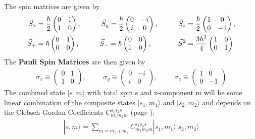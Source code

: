 The spin matrices are given by
\begin{align}
\vec{S}_x &= \frac{\hbar}{2}\begin{pmatrix}
0 & 1 \\ 1 & 0
\end{pmatrix}, \hspace{1cm}\vec{S}_y = \frac{\hbar}{2}\begin{pmatrix}
0 & -i \\ i & 0
\end{pmatrix}, \hspace{1cm}\vec{S}_z = \frac{\hbar}{2}\begin{pmatrix}
1 & 0 \\ 0 & -1
\end{pmatrix}, \\ \vec{S}_+ &= \hbar\begin{pmatrix}
0 & 1 \\ 0 & 0
\end{pmatrix}, \hspace{1cm}\vec{S}_- = \hbar\begin{pmatrix}
0 & 0 \\ 1 & 0
\end{pmatrix}, \hspace{1.3cm}\vec{S}^2 = \frac{3\hbar^2}{4}\begin{pmatrix}
1 & 0 \\ 0 & 1
\end{pmatrix}
\end{align}
The \textbf{Pauli Spin Matrices} are then given by
\begin{align}
\sigma_x \equiv \begin{pmatrix}
0 & 1 \\ 1 & 0
\end{pmatrix}, \hspace{1cm}\sigma_y \equiv \begin{pmatrix}
0 & -i \\ i & 0
\end{pmatrix}, \hspace{1cm}\sigma_z \equiv \begin{pmatrix}
1 & 0 \\ 0 & -1
\end{pmatrix}
\end{align}
The combined state $| s, m \rangle$  with total spin s and z-component m will be some linear combination of the composite states $| s_1, m_1 \rangle$ and $| s_2, m_2 \rangle$ and depends on the Clebsch-Gordan Coefficients $C_{m_1m_2m}^{s_1s_2s}$ (page \pageref{Clebsch-Gordan}):
\begin{align}
| s, m \rangle = \sum_{m=m_1+m_2} C_{m_1m_2m}^{s_1s_2s}| s_1, m_1 \rangle| s_2, m_2 \rangle
\end{align}

